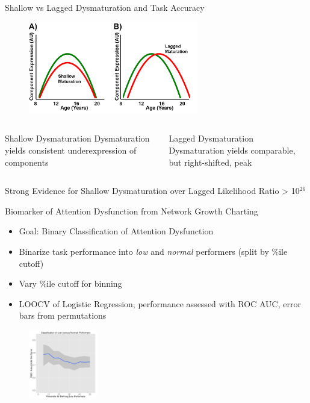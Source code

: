 \documentclass[presentation]{beamer}
\begin{document}
\begin{frame}[label={sec:orgheadline20}]{Shallow vs Lagged Dysmaturation and Task Accuracy}
\begin{figure}[htb]
\centering
\includegraphics[height=4cm]{./eFig7.png}
\end{figure}
\begin{columns}
\begin{column}{.5\columnwidth}
\alert{Shallow Dysmaturation}
Dysmaturation yields consistent underexpression of components
\end{column}
\begin{column}{.5\columnwidth}
\alert{Lagged Dysmaturation}
Dysmaturation yields comparable, but right-shifted, peak
\end{column}
\end{columns}
\begin{block}{Strong Evidence for Shallow Dysmaturation over Lagged}
Likelihood Ratio > 10\(^{\text{26}}\)
\end{block}
\end{frame}
\begin{frame}[label={sec:orgheadline21}]{Biomarker of Attention Dysfunction from Network Growth Charting}
\begin{itemize}
\item Goal: Binary Classification of Attention Dysfunction
\item Binarize task performance into \emph{low} and \emph{normal} performers (split by \%ile cutoff)
\item Vary \%ile cutoff for binning
\item LOOCV of Logistic Regression, performance assessed with ROC AUC, error bars from permutations
\end{itemize}
\begin{figure}[htb]
\centering
\includegraphics[height=3cm]{./Figure4.png}
\end{figure}
\end{frame}
\end{document}

